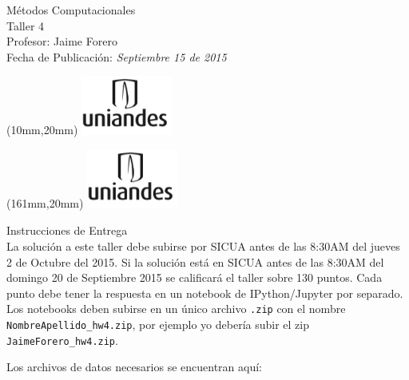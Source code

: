 \documentclass[11pt,letterpaper]{exam}
\begin{document}
\begin{center}
{\Large Métodos Computacionales} \\
Taller 4 \\
Profesor: Jaime Forero\\
Fecha de Publicación: {\small \it Septiembre 15 de 2015}\\
\end{center}

\begin{textblock*}{40mm}(10mm,20mm)
  \includegraphics[width=3cm]{logoUniandes.png}
\end{textblock*}

\begin{textblock*}{40mm}(161mm,20mm)
  \includegraphics[width=3cm]{logoUniandes.png}
\end{textblock*}

\vspace{0.5cm}

{\Large Instrucciones de Entrega}\\

\noindent
La solución a este taller debe subirse por SICUA antes de las 8:30AM
del jueves 2 de Octubre del 2015. 
\noindent
Si la soluci\'on est\'a en SICUA
antes de las 8:30AM del domingo 20 de Septiembre 2015 se calificar\'a
el taller sobre 130 puntos. 
\noindent
Cada punto debe tener la respuesta en un notebook de IPython/Jupyter por
separado. Los notebooks deben subirse en un \'unico archivo
\verb".zip" con el nombre \verb"NombreApellido_hw4.zip", por ejemplo
yo deber\'ia subir el zip \verb"JaimeForero_hw4.zip".

\noindent
Los archivos de datos necesarios se encuentran aqu\'i:
\end{document}
